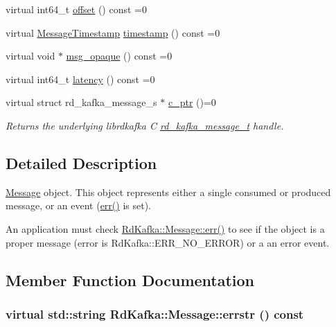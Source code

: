 \begin{DoxyCompactItemize}
\item 
virtual int64\_\-t \hyperlink{classRdKafka_1_1Message_a5a8efc75fd27f8839997fc506776db67}{offset} () const =0
\item 
virtual \hyperlink{classRdKafka_1_1MessageTimestamp}{MessageTimestamp} \hyperlink{classRdKafka_1_1Message_a710964fe3cfdf9555d176d1a6047a1ec}{timestamp} () const =0
\item 
virtual void $\ast$ \hyperlink{classRdKafka_1_1Message_ae13ce414d2c6ad68ddefc4ccca640f17}{msg\_\-opaque} () const =0
\item 
virtual int64\_\-t \hyperlink{classRdKafka_1_1Message_a8cce832cbab290d193b028ca3f689b07}{latency} () const =0
\item 
virtual struct rd\_\-kafka\_\-message\_\-s $\ast$ \hyperlink{classRdKafka_1_1Message_a6add1e2620c7ac4283f150e48cb6e53e}{c\_\-ptr} ()=0
\begin{DoxyCompactList}\small\item\em Returns the underlying librdkafka C \hyperlink{structrd__kafka__message__t}{rd\_\-kafka\_\-message\_\-t} handle. \item\end{DoxyCompactList}\end{DoxyCompactItemize}


\subsection{Detailed Description}
\hyperlink{classRdKafka_1_1Message}{Message} object. This object represents either a single consumed or produced message, or an event ({\ttfamily \hyperlink{classRdKafka_1_1Message_a90df1fd2a73a74220c9581e6bedb42f2}{err()}} is set).

An application must check \hyperlink{classRdKafka_1_1Message_a90df1fd2a73a74220c9581e6bedb42f2}{RdKafka::Message::err()} to see if the object is a proper message (error is RdKafka::ERR\_\-NO\_\-ERROR) or a an error event. 

\subsection{Member Function Documentation}
\hypertarget{classRdKafka_1_1Message_a3f3471916c7375945d837b05af05aa94}{
\subsubsection[{errstr}]{\setlength{\rightskip}{0pt plus 5cm}virtual std::string RdKafka::Message::errstr () const}}
\label{classRdKafka_1_1Message_a3f3471916c7375945d837b05af05aa94}


